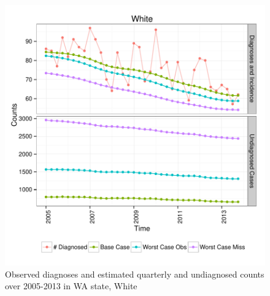 \documentclass{article}\usepackage[]{graphicx}\usepackage[]{color}
\makeatletter
\def\maxwidth{ %
  \ifdim\Gin@nat@width>\linewidth
    \linewidth
  \else
    \Gin@nat@width
  \fi
}
\newenvironment{knitrout}{}{} %
\makeatother
\begin{document}
\begin{knitrout}\footnotesize
{}\color{fgcolor}\begin{figure}[]


{\centering \includegraphics[width=\maxwidth]{figure/minimal-plot_subgroup_White} 

}

\caption[Observed diagnoses and estimated quarterly and undiagnosed counts over 2005-2013 in WA state, White]{Observed diagnoses and estimated quarterly and undiagnosed counts over 2005-2013 in WA state, White\label{fig:plot_subgroup_White}}
\end{figure}


\end{knitrout}
\end{document}
